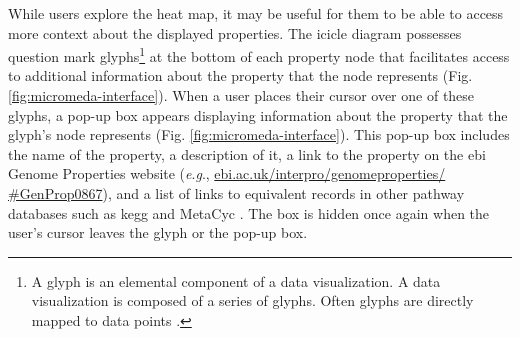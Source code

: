 While users explore the heat map, it may be useful for them to be able to access 
more context about the displayed properties. The icicle diagram possesses 
question mark glyphs\footnote{A glyph is an elemental component of a data 
visualization. A data visualization is composed of a series of glyphs. Often 
glyphs are directly mapped to data points \cite{chen}.} at the bottom of each 
property node that facilitates access to additional information about the 
property that the node represents (Fig. \ref{fig:micromeda-interface}). When a 
user places their cursor over one of these glyphs, a pop-up box appears 
displaying information about the property that the glyph's node represents (Fig. 
\ref{fig:micromeda-interface}). This pop-up box includes the name of the 
property, a description of it, a link to the property on the \gls{ebi} Genome 
Properties website (\textit{e}.\textit{g}., 
\href{https://www.ebi.ac.uk/interpro/genomeproperties/#GenProp0867}{ebi.ac.uk/interpro/genomeproperties/ 
\#GenProp0867}), and a list of links to equivalent records in other pathway 
databases such as \gls{kegg} \cite{kanehisa2000kegg} and MetaCyc 
\cite{karp2002metacyc}. The box is hidden once again when the user's cursor 
leaves the glyph or the pop-up box.


